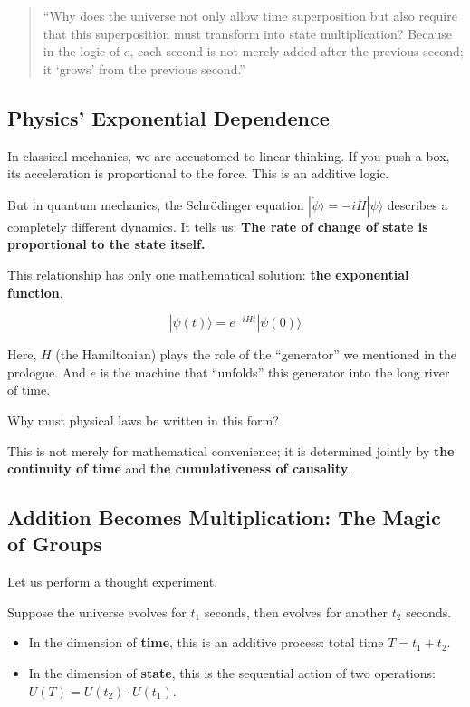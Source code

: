 \documentclass[11pt,a4paper,twoside]{book}
\begin{document}
\begin{quote}
``Why does the universe not only allow time superposition but also require that this superposition must transform into state multiplication? Because in the logic of $e$, each second is not merely added after the previous second; it `grows' from the previous second.''
\end{quote}

\subsection{Physics' Exponential Dependence}

In classical mechanics, we are accustomed to linear thinking. If you push a box, its acceleration is proportional to the force. This is an additive logic.

But in quantum mechanics, the Schrödinger equation $|\dot{\psi}\rangle = -iH|\psi\rangle$ describes a completely different dynamics. It tells us: \textbf{The rate of change of state is proportional to the state itself.}

This relationship has only one mathematical solution: \textbf{the exponential function}.

$$|\psi(t)\rangle = e^{-iHt} |\psi(0)\rangle$$

Here, $H$ (the Hamiltonian) plays the role of the ``generator'' we mentioned in the prologue. And $e$ is the machine that ``unfolds'' this generator into the long river of time.

Why must physical laws be written in this form?

This is not merely for mathematical convenience; it is determined jointly by \textbf{the continuity of time} and \textbf{the cumulativeness of causality}.

\subsection{Addition Becomes Multiplication: The Magic of Groups}

Let us perform a thought experiment.

Suppose the universe evolves for $t_1$ seconds, then evolves for another $t_2$ seconds.

\begin{itemize}
\item In the dimension of \textbf{time}, this is an additive process: total time $T = t_1 + t_2$.

\item In the dimension of \textbf{state}, this is the sequential action of two operations: $U(T) = U(t_2) \cdot U(t_1)$.
\end{itemize}
\end{document}
